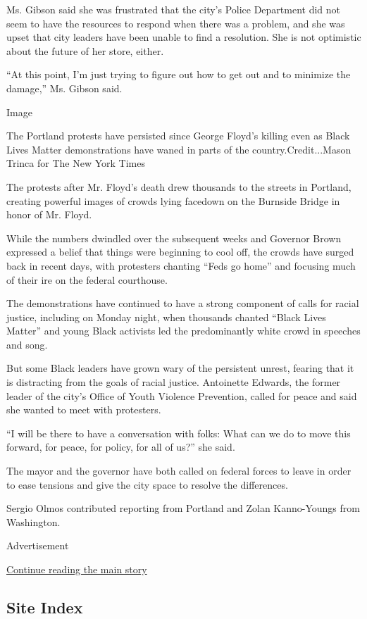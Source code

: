 Ms. Gibson said she was frustrated that the city's Police Department did
not seem to have the resources to respond when there was a problem, and
she was upset that city leaders have been unable to find a resolution.
She is not optimistic about the future of her store, either.

``At this point, I'm just trying to figure out how to get out and to
minimize the damage,'' Ms. Gibson said.

Image

The Portland protests have persisted since George Floyd's killing even
as Black Lives Matter demonstrations have waned in parts of the
country.Credit...Mason Trinca for The New York Times

The protests after Mr. Floyd's death drew thousands to the streets in
Portland, creating powerful images of crowds lying facedown on the
Burnside Bridge in honor of Mr. Floyd.

While the numbers dwindled over the subsequent weeks and Governor Brown
expressed a belief that things were beginning to cool off, the crowds
have surged back in recent days, with protesters chanting ``Feds go
home'' and focusing much of their ire on the federal courthouse.

The demonstrations have continued to have a strong component of calls
for racial justice, including on Monday night, when thousands chanted
``Black Lives Matter'' and young Black activists led the predominantly
white crowd in speeches and song.

But some Black leaders have grown wary of the persistent unrest, fearing
that it is distracting from the goals of racial justice. Antoinette
Edwards, the former leader of the city's Office of Youth Violence
Prevention, called for peace and said she wanted to meet with
protesters.

``I will be there to have a conversation with folks: What can we do to
move this forward, for peace, for policy, for all of us?'' she said.

The mayor and the governor have both called on federal forces to leave
in order to ease tensions and give the city space to resolve the
differences.

Sergio Olmos contributed reporting from Portland and Zolan Kanno-Youngs
from Washington.

Advertisement

\protect\hyperlink{after-bottom}{Continue reading the main story}

\hypertarget{site-index}{%
\subsection{Site Index}\label{site-index}}

